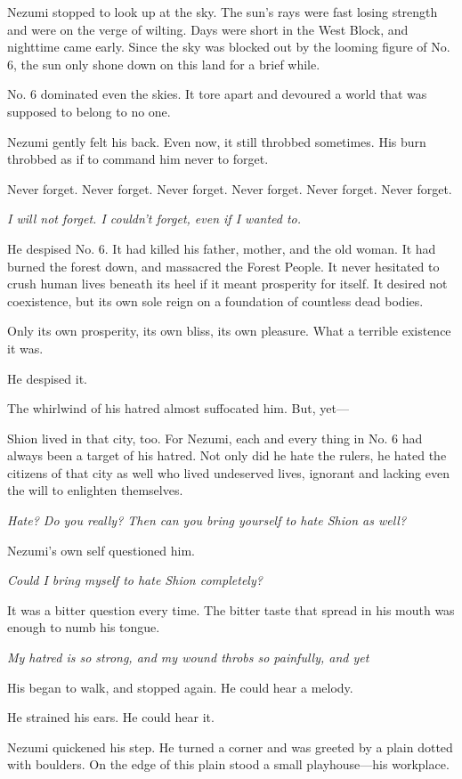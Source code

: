 Nezumi stopped to look up at the sky. The sun's rays were fast losing
strength and were on the verge of wilting. Days were short in the West
Block, and nighttime came early. Since the sky was blocked out by the
looming figure of No. 6, the sun only shone down on this land for a
brief while.

No. 6 dominated even the skies. It tore apart and devoured a world that
was supposed to belong to no one.

Nezumi gently felt his back. Even now, it still throbbed sometimes. His
burn throbbed as if to command him never to forget.

Never forget. Never forget. Never forget. Never forget. Never forget.
Never forget.

\emph{I will not forget. I couldn't forget, even if I wanted to.}

He despised No. 6. It had killed his father, mother, and the old woman.
It had burned the forest down, and massacred the Forest People. It never
hesitated to crush human lives beneath its heel if it meant prosperity
for itself. It desired not coexistence, but its own sole reign on a
foundation of countless dead bodies.

Only its own prosperity, its own bliss, its own pleasure. What a
terrible existence it was.

He despised it.

The whirlwind of his hatred almost suffocated him. But, yet---

Shion lived in that city, too. For Nezumi, each and every thing in No. 6
had always been a target of his hatred. Not only did he hate the rulers,
he hated the citizens of that city as well who lived undeserved lives,
ignorant and lacking even the will to enlighten themselves.

\emph{Hate? Do you really? Then can you bring yourself to hate Shion as well?}

Nezumi's own self questioned him.

\emph{Could I bring myself to hate Shion completely?}

It was a bitter question every time. The bitter taste that spread in his
mouth was enough to numb his tongue.

\emph{My hatred is so strong, and my wound throbs so painfully, and yet\el }

His began to walk, and stopped again. He could hear a melody.~

He strained his ears. He could hear it.

Nezumi quickened his step. He turned a corner and was greeted by a plain
dotted with boulders. On the edge of this plain stood a small
playhouse---his workplace.

